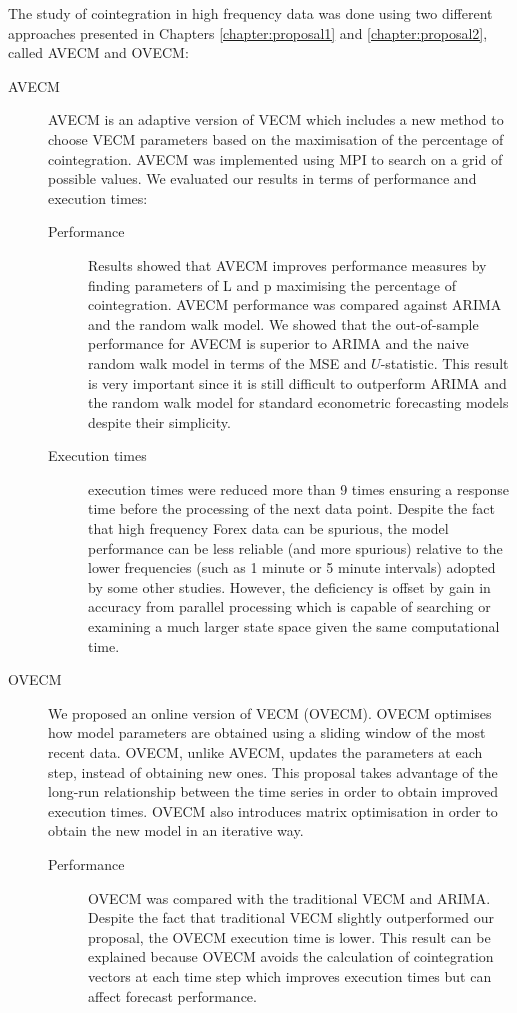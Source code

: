 The study of cointegration in high frequency data was done using two different
approaches presented in Chapters \ref{chapter:proposal1} and
\ref{chapter:proposal2}, called AVECM and OVECM:
\begin{description}
\item[AVECM] AVECM is an adaptive version of VECM which includes a new method to choose VECM parameters based on
the maximisation of the percentage of cointegration. AVECM was implemented using
MPI to search on a grid of possible values. We evaluated our results in terms of performance and execution times:
\begin{description}
\item[Performance] Results showed that AVECM improves
performance measures by finding parameters of L and p maximising the percentage
of cointegration. AVECM performance was compared against ARIMA and the random walk model. We showed that the out-of-sample performance for AVECM is superior to ARIMA and the naive random walk model in terms of the MSE and $U$-statistic. This result is very important since it is still difficult to outperform ARIMA and the random walk model for standard econometric forecasting models  despite their simplicity. 
\item[Execution times] execution times were reduced more than 9 times
ensuring a response time before the processing of the next data point. Despite the fact that high frequency Forex data can be spurious, the model
performance can be less reliable (and more spurious) relative to the lower
frequencies (such as 1 minute or 5 minute intervals) adopted by some other
studies. However, the deficiency is offset by gain in accuracy from parallel
processing which is capable of searching or examining a much larger state space
given the same computational time.
\end{description}
\item[OVECM] We proposed an online version of VECM (OVECM). OVECM optimises how
model parameters are obtained using a sliding window of the most recent data.
OVECM, unlike AVECM, updates the parameters at each step, instead of obtaining
new ones. This proposal takes advantage of the long-run relationship
between the time series in order to obtain improved execution times. OVECM also
introduces matrix optimisation in order to obtain the new model in an iterative
way.  
\begin{description}
\item[Performance] 
OVECM was compared with the traditional VECM and ARIMA. Despite the fact that traditional VECM slightly outperformed our proposal, the OVECM execution time is lower. This result can be explained because OVECM avoids the calculation of cointegration vectors at each time step which improves execution times but can affect forecast performance.

\end{description}
\end{description}
